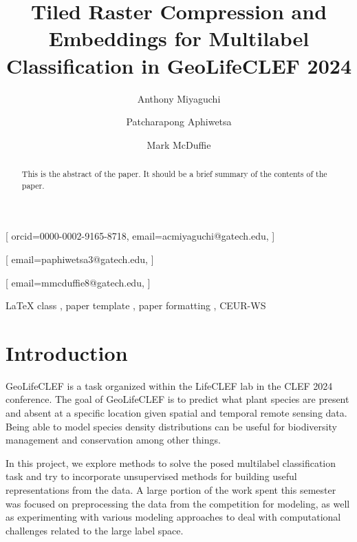 \documentclass[]{style/ceurart}
\begin{document}


\title{Tiled Raster Compression and Embeddings for Multilabel Classification in GeoLifeCLEF 2024}

\author[1]{Anthony Miyaguchi}[
orcid=0000-0002-9165-8718,
email=acmiyaguchi@gatech.edu,
]
\cormark[1]
\author[1]{Patcharapong Aphiwetsa}[
email=paphiwetsa3@gatech.edu,
]
\author[1]{Mark McDuffie}[
email=mmcduffie8@gatech.edu,
]

\address[1]{Georgia Institute of Technology, North Ave NW, Atlanta, GA 30332}

\begin{abstract}
    This is the abstract of the paper. 
    It should be a brief summary of the contents of the paper.
\end{abstract}

\begin{keywords}
  LaTeX class \sep
  paper template \sep
  paper formatting \sep
  CEUR-WS
\end{keywords}


\maketitle

\section{Introduction}

GeoLifeCLEF is a task organized within the LifeCLEF lab in the CLEF 2024 conference. 
The goal of GeoLifeCLEF is to predict what plant species are present and absent at a specific location given spatial and temporal remote sensing data. 
Being able to model species density distributions can be useful for biodiversity management and conservation among other things.

In this project, we explore methods to solve the posed multilabel classification task and try to incorporate unsupervised methods for building useful representations from the data. 
A large portion of the work spent this semester was focused on preprocessing the data from the competition for modeling, as well as experimenting with various modeling approaches to deal with computational challenges related to the large label space.
\end{document}
